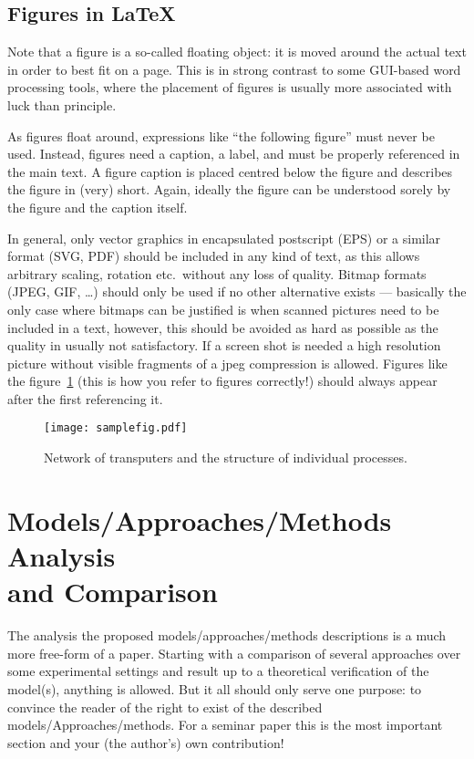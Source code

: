 \documentclass[12pt,twoside]{article}
\theoremstyle{plain}
\theoremstyle{definition}
\theoremstyle{remark}
\begin{document}
\subsection{Figures in \LaTeX}
\label{sec:model:subsec:figures}
Note that a figure is a so-called floating object: it is moved around the actual text in order to best fit on a page. This is in strong contrast to some GUI-based word processing tools, where the placement of figures is usually more associated with luck than principle.

As figures float around, expressions like ``the following figure'' must never be used. Instead, figures need a caption, a label, and must be properly referenced in the main text. A figure caption is placed centred below the figure and describes the figure in (very) short. Again, ideally the figure can be understood sorely by the figure and the caption itself.

In general, only vector graphics in encapsulated postscript (EPS) or a similar format (SVG, PDF) should be included in any kind of text, as this allows arbitrary scaling, rotation etc.\ without any loss of quality. Bitmap formats (JPEG, GIF, \dots) should only be used if no other alternative exists --- basically the only case where bitmaps can be justified is when scanned pictures need to be included in a text, however, this should be avoided as hard as possible as the quality in usually not satisfactory. If a screen shot is needed a high resolution picture without visible fragments of a jpeg compression is allowed. Figures like the figure~\ref{fig:samplefig} (this is how you refer to figures correctly!) should always appear after the first referencing it.
\begin{figure}[hbtp]
	 \centerline{\texttt{[image: samplefig.pdf]}}
	 {\caption{Network of transputers and the structure of individual
processes.}\label{fig:samplefig}}
\end{figure}

\section{Models/Approaches/Methods Analysis \\ and Comparison}
\label{sec:analysis}
The analysis the proposed models/approaches/methods descriptions is a much more free-form of a paper. Starting with a comparison of several approaches over some experimental settings and result up to a theoretical verification of the model(s), anything is allowed. But it all should only serve one purpose: to convince the reader of the right to exist of the described models/Approaches/methods. For a seminar paper this is the most important section and your (the author's) own contribution!
\end{document}
